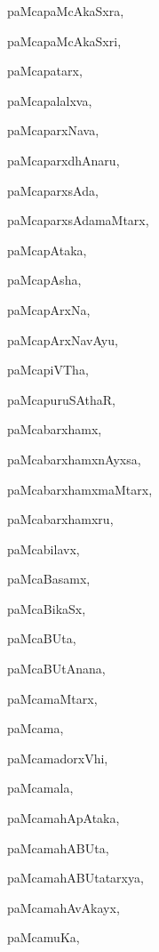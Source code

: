 \begin{multicols}{2}
{paMcapaMcAkaSxra}, \pageref{paMcapaMcAkaSxra}

{paMcapaMcAkaSxri}, \pageref{paMcapaMcAkaSxri}

{paMcapatarx}, \pageref{paMcapatarx}

{paMcapalalxva}, \pageref{paMcapalalxva}

{paMcaparxNava}, \pageref{paMcaparxNava}

{paMcaparxdhAnaru}, \pageref{paMcaparxdhAnaru}

{paMcaparxsAda}, \pageref{paMcaparxsAda}

{paMcaparxsAdamaMtarx}, \pageref{paMcaparxsAdamaMtarx}

{paMcapAtaka}, \pageref{paMcapAtaka}

{paMcapAsha}, \pageref{paMcapAsha}

{paMcapArxNa}, \pageref{paMcapArxNa}

{paMcapArxNavAyu}, \pageref{paMcapArxNavAyu}

{paMcapiVTha}, \pageref{paMcapiVTha}

{paMcapuruSAthaR}, \pageref{paMcapuruSAthaR}

{paMcabarxhamx}, \pageref{paMcabarxhamx}

{paMcabarxhamxnAyxsa}, \pageref{paMcabarxhamxnAyxsa}

{paMcabarxhamxmaMtarx}, \pageref{paMcabarxhamxmaMtarx}

{paMcabarxhamxru}, \pageref{paMcabarxhamxru}

{paMcabilavx}, \pageref{paMcabilavx}

{paMcaBasamx}, \pageref{paMcaBasamx}

{paMcaBikaSx}, \pageref{paMcaBikaSx}

{paMcaBUta}, \pageref{paMcaBUta2}

{paMcaBUtAnana}, \pageref{paMcaBUtAnana}

{paMcamaMtarx}, \pageref{paMcamaMtarx}

{paMcama}, \pageref{paMcama}

{paMcamadorxVhi}, \pageref{paMcamadorxVhi}

{paMcamala}, \pageref{paMcamala}

{paMcamahApAtaka}, \pageref{paMcamahApAtaka}

{paMcamahABUta}, \pageref{paMcamahABUta}

{paMcamahABUtatarxya}, \pageref{paMcamahABUtatarxya}

{paMcamahAvAkayx}, \pageref{paMcamahAvAkayx}

{paMcamuKa}, \pageref{paMcamuKa}


\end{multicols}
